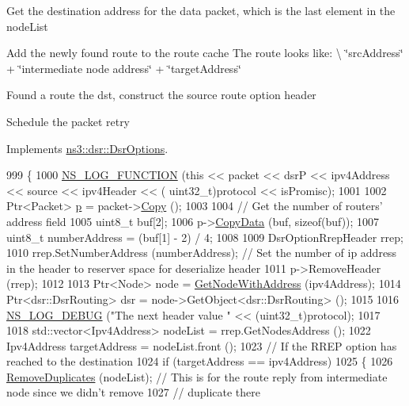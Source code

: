 Get the destination address for the data packet, which is the last element in the node\+List

Add the newly found route to the route cache The route looks like\+: \textbackslash{} \char`\"{}src\+Address\char`\"{} + \char`\"{}intermediate node address\char`\"{} + \char`\"{}target\+Address\char`\"{}

Found a route the dst, construct the source route option header

Schedule the packet retry

Implements \hyperlink{classns3_1_1dsr_1_1DsrOptions_ac34fb87a95464f3ea9d82ad12253a5cc}{ns3\+::dsr\+::\+Dsr\+Options}.


\begin{DoxyCode}
999 \{
1000   \hyperlink{log-macros-disabled_8h_a90b90d5bad1f39cb1b64923ea94c0761}{NS\_LOG\_FUNCTION} (\textcolor{keyword}{this} << packet << dsrP << ipv4Address << source << ipv4Header << (
      uint32\_t)protocol << isPromisc);
1001 
1002   Ptr<Packet> \hyperlink{lte__link__budget_8m_ac9de518908a968428863f829398a4e62}{p} = packet->\hyperlink{classns3_1_1Packet_a5d5c70802a5f77fc5f0001e0cfc1898b}{Copy} ();
1003 
1004   \textcolor{comment}{// Get the number of routers' address field}
1005   uint8\_t buf[2];
1006   p->\hyperlink{classns3_1_1Packet_a5a6d304b9e0d90733919ffe224b98f0d}{CopyData} (buf, \textcolor{keyword}{sizeof}(buf));
1007   uint8\_t numberAddress = (buf[1] - 2) / 4;
1008 
1009   DsrOptionRrepHeader rrep;
1010   rrep.SetNumberAddress (numberAddress);  \textcolor{comment}{// Set the number of ip address in the header to reserver space
       for deserialize header}
1011   p->RemoveHeader (rrep);
1012 
1013   Ptr<Node> node = \hyperlink{classns3_1_1dsr_1_1DsrOptions_a1a91f820f3d754a477a54bad547ca659}{GetNodeWithAddress} (ipv4Address);
1014   Ptr<dsr::DsrRouting> dsr = node->GetObject<dsr::DsrRouting> ();
1015 
1016   \hyperlink{group__logging_ga413f1886406d49f59a6a0a89b77b4d0a}{NS\_LOG\_DEBUG} (\textcolor{stringliteral}{"The next header value "} << (uint32\_t)protocol);
1017 
1018   std::vector<Ipv4Address> nodeList = rrep.GetNodesAddress ();
1022   Ipv4Address targetAddress = nodeList.front ();
1023   \textcolor{comment}{// If the RREP option has reached to the destination}
1024   \textcolor{keywordflow}{if} (targetAddress == ipv4Address)
1025     \{
1026       \hyperlink{classns3_1_1dsr_1_1DsrOptions_a7b822a7c827006feddd82cc9baab03bd}{RemoveDuplicates} (nodeList); \textcolor{comment}{// This is for the route reply from intermediate node
       since we didn't remove}
1027                                    \textcolor{comment}{// duplicate there}

\end{DoxyCode}
